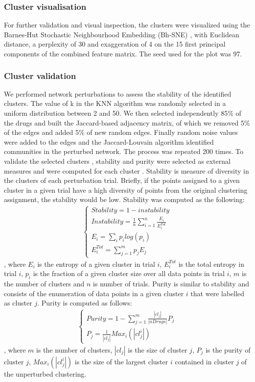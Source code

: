\subsubsection{Cluster visualisation}
For further validation and visual inspection, the clusters were visualized using the Barnes-Hut Stochastic Neighbourhood Embedding (Bh-SNE) \cite{van2013barnes}, with Euclidean distance, a perplexity of 30 and exaggeration of 4 on the 15 first principal components of the combined feature matrix. The seed used for the plot was 97.
\subsubsection{Cluster validation}
We performed network perturbations to assess the stability of the identified clusters. The value of k in the KNN algorithm was randomly selected in a uniform distribution between 2 and 50. We then selected independently 85\% of the drugs and built the Jaccard-based adjacency matrix, of which we removed 5\% of the edges and added 5\% of new random edges. Finally random noise values were added to the edges and the Jaccard-Louvain\cite{blondel2008fast} algorithm identified communities in the perturbed network. The process was repeated 200 times.
To validate the selected clusters \cite{shekhar2016comprehensive}, stability and purity were selected as external measures and were computed for each cluster \cite{von2010clustering}. Stability is measure of diversity in the clusters of each perturbation trial. Briefly, if the points assigned to a given cluster in a given trial have a high diversity of points from the original clustering assignment, the stability would be low. Stability was computed as the following:
\begin{gather*}
\begin{cases}
  Stability=1-instability\\
  Instability=\frac{1}{n} \sum_{i=1}^{n} \frac{E_{i}}{E_{i}^{Tot}}\\
  E_i=\sum_{i} p_{i}log(p_i)\\
  E_{i}^{Tot}=\sum_{j=1}^{m}p_{j}E_{j}
\end{cases}
\end{gather*}
, where $E_i$ is the entropy of a given cluster in trial $i$, $E_i^{Tot}$ is the total entropy in trial $i$, $p_i$ is the fraction of a given cluster size over all data points in trial $i$, $m$ is the number of clusters and $n$ is number of trials.
Purity is similar to stability and consists of the enumeration of data points in a given cluster $i$ that were labelled as cluster $j$. Purity is computed as follows:
\begin{gather*}
\begin{cases}
  Purity=1-\sum_{j=1}^{m} \frac{|cl_{j}|}{|nDrugs|}P_{j}\\
  P_{j}=\frac{1}{|cl_{j}|}Max_{i}(|cl_{j}^{i}|)
\end{cases}
\end{gather*}
, where $m$ is the number of clusters, $|cl_j|$ is the size of cluster $j$, $P_j$ is the purity of cluster $j$, $Max_i(|cl_{j}^{i} |)$ is the size of the largest cluster $i$ contained in cluster $j$ of the unperturbed clustering.
